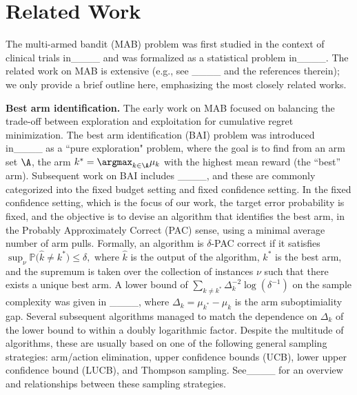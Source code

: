 \section{Related Work}
The multi-armed bandit (MAB) problem was first studied in the context of clinical trials in____ and was formalized as a statistical problem in____. The related work on MAB is extensive (e.g., see ____ and the references therein); we only provide a brief outline here, emphasizing the most closely related works.

\textbf{Best arm identification.}
The early work on MAB focused on balancing the trade-off between exploration 
and exploitation
for cumulative regret minimization.
The best arm identification (BAI) problem was introduced in____ as a ``pure exploration" problem, where the goal is to find from an arm set $\A$, the arm $k^* = \argmax_{k \in \A} \mu_k$ with the highest mean reward (the ``best'' arm).
Subsequent work on BAI includes ____, and these are commonly categorized into the
fixed budget setting and fixed confidence setting.
In the fixed confidence setting, which is the focus of our work, the target error probability is fixed, and the objective is to devise an algorithm that identifies the best arm, in the Probably Approximately Correct (PAC) sense, using a minimal average number of arm pulls.  
Formally, an algorithm is $\delta$-PAC correct if it satisfies 
$
    \sup_{\nu} \mathbb{P}\big(\hat{k} \ne k^* \big) \le \delta,
$ where $\hat{k}$ is the output of the algorithm, $k^*$ is the best arm, and the supremum is taken over the collection of instances $\nu$ such that there exists a unique best arm.
A lower bound of $\sum_{k \ne k^*} \Delta_k^{-2} \log(\delta^{-1})$ on the sample complexity was given in
____, where $\Delta_k = \mu_{k^*} - \mu_k$ is the arm suboptimiality gap.
Several subsequent algorithms managed to match the dependence on $\Delta_k$ of the lower bound to within a doubly logarithmic factor. 
Despite the multitude of algorithms, these are usually based on one of the following general sampling strategies: arm/action elimination, upper confidence bounds (UCB), lower upper confidence bound (LUCB), and Thompson sampling.  See____ for an overview and relationships between these sampling strategies.



